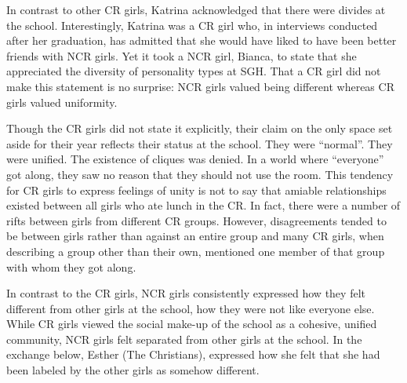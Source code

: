 \label{cliques}

\vspace{5 mm}

\noindent In contrast to other CR girls, Katrina acknowledged that there were divides at the school. Interestingly, Katrina was a CR girl who, in interviews conducted after her graduation, has admitted that she would have liked to have been better friends with NCR girls.  Yet it took a NCR girl, Bianca, to state that she appreciated the diversity of personality types at SGH. That a CR girl did not make this statement is no surprise: NCR girls valued being different whereas CR girls valued uniformity.

Though the CR girls did not state it explicitly, their claim on the only space set aside for their year reflects their status at the school. They were ``normal''. They were unified. The existence of cliques was denied. In a world where ``everyone'' got along, they saw no reason that they should not use the room. This tendency for CR girls to express feelings of unity is not to say that amiable relationships existed between all girls who ate lunch in the CR. In fact, there were a number of rifts between girls from different CR groups. However, disagreements tended to be between girls rather than against an entire group and many CR girls, when describing a group other than their own, mentioned one member of that group with whom they got along.

\largerpage[-1]
In contrast to the CR girls, NCR girls consistently expressed how they felt different from other girls at the school, how they were not like everyone else. While CR girls viewed the social make-up of the school as a cohesive, unified community, NCR girls felt separated from other girls at the school. In the exchange below, Esther (The Christians), expressed how she felt that she had been labeled by the other girls as somehow different.

